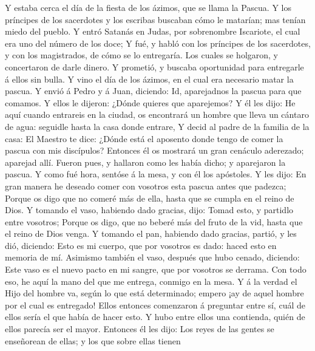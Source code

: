  Y estaba cerca el día de la fiesta de los ázimos, que se
llama la Pascua.  Y los príncipes de los sacerdotes y los
escribas buscaban cómo le matarían; mas tenían miedo del pueblo.
 Y entró Satanás en Judas, por sobrenombre Iscariote, el
cual era uno del número de los doce;  Y fué, y habló con
los príncipes de los sacerdotes, y con los magistrados, de cómo se lo
entregaría.  Los cuales se holgaron, y concertaron de
darle dinero.  Y prometió, y buscaba oportunidad para
entregarle á ellos sin bulla.  Y vino el día de los
ázimos, en el cual era necesario matar la pascua.  Y envió
á Pedro y á Juan, diciendo: Id, aparejadnos la pascua para que comamos.
 Y ellos le dijeron: ¿Dónde quieres que aparejemos?
 Y él les dijo: He aquí cuando entrareis en la ciudad, os
encontrará un hombre que lleva un cántaro de agua: seguidle hasta la
casa donde entrare,  Y decid al padre de la familia de la
casa: El Maestro te dice: ¿Dónde está el aposento donde tengo de comer
la pascua con mis discípulos?  Entonces él os mostrará un
gran cenáculo aderezado; aparejad allí.  Fueron pues, y
hallaron como les había dicho; y aparejaron la pascua.  Y
como fué hora, sentóse á la mesa, y con él los apóstoles.
 Y les dijo: En gran manera he deseado comer con vosotros
esta pascua antes que padezca;  Porque os digo que no
comeré más de ella, hasta que se cumpla en el reino de Dios.
 Y tomando el vaso, habiendo dado gracias, dijo: Tomad
esto, y partidlo entre vosotros;  Porque os digo, que no
beberé más del fruto de la vid, hasta que el reino de Dios venga.
 Y tomando el pan, habiendo dado gracias, partió, y les
dió, diciendo: Esto es mi cuerpo, que por vosotros es dado: haced esto
en memoria de mí.  Asimismo también el vaso, después que
hubo cenado, diciendo: Este vaso es el nuevo pacto en mi sangre, que por
vosotros se derrama.  Con todo eso, he aquí la mano del
que me entrega, conmigo en la mesa.  Y á la verdad el
Hijo del hombre va, según lo que está determinado; empero ¡ay de aquel
hombre por el cual es entregado!  Ellos entonces
comenzaron á preguntar entre sí, cuál de ellos sería el que había de
hacer esto.  Y hubo entre ellos una contienda, quién de
ellos parecía ser el mayor.  Entonces él les dijo: Los
reyes de las gentes se enseñorean de ellas; y los que sobre ellas tienen
